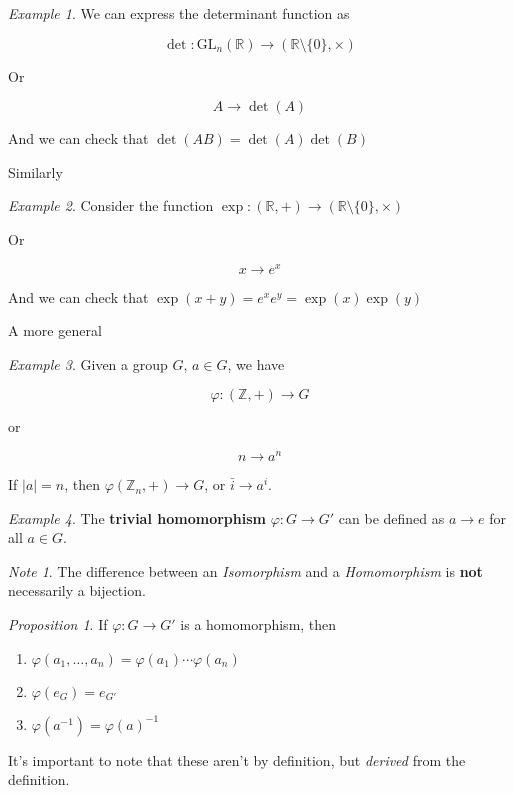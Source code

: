 \documentclass[12pt]{article}
\def\phi{\varphi}
\def\gl{\text{GL}}
\def\Z{{\mathbb Z}}
\def\R{{\mathbb R}}
\theoremstyle{remark}
\newtheorem{proposition}{Proposition}
\theoremstyle{remark}
\theoremstyle{remark}
\newtheorem{example}{Example}
\theoremstyle{remark}
\theoremstyle{remark}
\newtheorem*{note}{Note}
\begin{document}
\begin{example}
	We can express the determinant function as

	\[
		\det : \gl_n(\R) \to (\R \setminus \{0\}, \times)
	\]

	Or

	\[
		A \to \det(A)
	\]

	And we can check that $\det(AB) = \det(A)\det(B)$
\end{example}

Similarly

\begin{example}
	Consider the function $\exp : (\R, +) \to (\R \setminus \{0\}, \times)$

	Or

	\[
		x \to e^x
	\]

	And we can check that $\exp(x + y) = e^x e^y = \exp(x) \exp(y)$
\end{example}

A more general

\begin{example}
	Given a group $G$, $a \in G$, we have

	\[
		\varphi: (\Z, +) \to G
	\]

	or

	\[
		n \to a^n
	\]

	If $|a| = n$, then $\varphi(\Z_n, +) \to G$, or $\bar i \to a^i$.
\end{example}

\begin{example}
	The {\bf trivial homomorphism} $\phi: G \to G'$ can be defined as $a \to e$
	for all $a \in G$.
\end{example}

\begin{note}
  The difference between an {\it Isomorphism} and a {\it Homomorphism} is {\bf
  not} necessarily a bijection.
\end{note}

\begin{proposition}
  If $\varphi: G \to G'$ is a homomorphism, then

  \begin{enumerate}
    \item $\varphi(a_1, \dots, a_n) = \varphi(a_1) \cdots \varphi(a_n)$
    \item $\varphi(e_G) = e_{G'}$
    \item $\varphi(a^{-1}) = \varphi(a)^{-1}$
  \end{enumerate}

  It's important to note that these aren't by definition, but {\it derived} from
  the definition.
\end{proposition}
\end{document}
